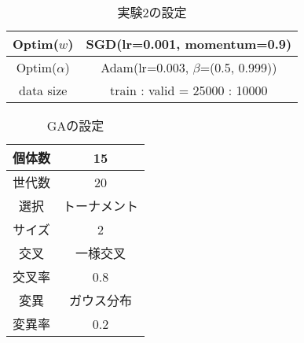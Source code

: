 \begin{table}[t]
  \begin{center}
    \caption{実験2の設定}
  	\vspace{3mm}
    \begin{tabular}{|c|c|} \hline
      Optim($w$) & SGD(lr=0.001, momentum=0.9) \\ \hline
      Optim($\alpha$) & Adam(lr=0.003, $\beta$=(0.5, 0.999)) \\ \hline
      data size & train : valid = 25000 : 10000 \\ \hline
    \end{tabular}
    \label{tab:setting2}
  \end{center}
\end{table}

\begin{table}[t]
  \begin{center}
    \caption{GAの設定}
  	\vspace{3mm}
    \begin{tabular}{|c|c|} \hline
      個体数 & 15 \\ \hline
      世代数 & 20 \\ \hline \hline
      選択 & トーナメント \\ \hline
      サイズ & 2 \\ \hline \hline
      交叉 & 一様交叉 \\ \hline
      交叉率 & 0.8 \\ \hline \hline
      変異 & ガウス分布 \\ \hline
      変異率 & 0.2 \\ \hline
    \end{tabular}
    \label{tab:setting_ga}
  \end{center}
\end{table}
